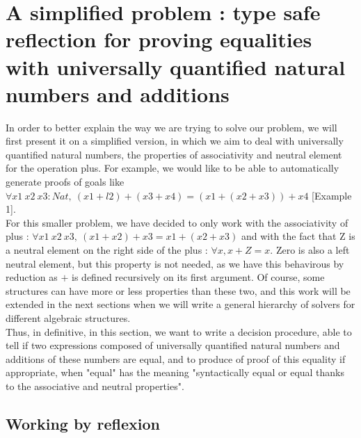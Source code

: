 \section{A simplified problem : type safe reflection for proving equalities with universally quantified natural numbers and additions}


In order to better explain the way we are trying to solve our problem, we will first present it on a simplified version, in which we aim to deal with universally quantified natural numbers, the properties of associativity and neutral element for the operation plus.
For example, we would like to be able to automatically generate proofs of goals like $\forall x1\ x2\ x3:Nat,\ (x1 + l2) + (x3 + x4) = (x1 + (x2 + x3)) + x4$ [Example 1]. \\
For this smaller problem, we have decided to only work with the associativity of plus : $\forall x1\ x2\ x3,\ (x1 + x2) + x3 = x1 + (x2 + x3)$ and with the fact that Z is a neutral element on the right side of the plus : $\forall x, x + Z = x$. Zero is also a left neutral element, but this property is not needed, as we have this behavirous by reduction as $+$ is defined recursively on its first argument. Of course, some structures can have more or less properties than these two, and this work will be extended in the next sections when we will write a general hierarchy of solvers for different algebraic structures. \\
Thus, in definitive, in this section, we want to write a decision procedure, able to tell if two expressions composed of universally quantified natural numbers and additions of these numbers are equal, and to produce of proof of this equality if appropriate, when "equal" has the meaning "syntactically equal or equal thanks to the associative and neutral properties". \\


\subsection{Working by reflexion}


